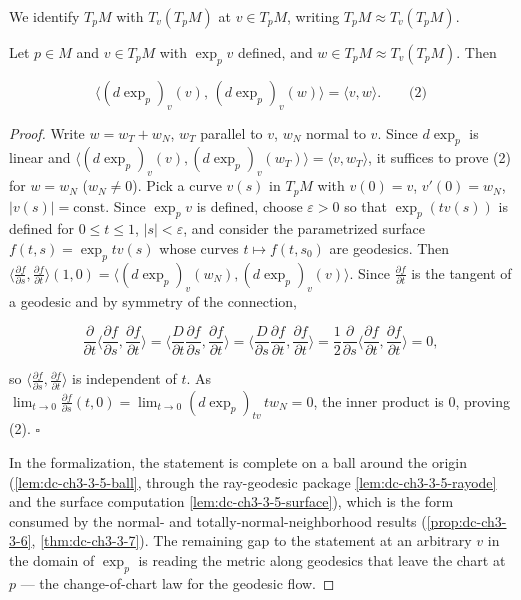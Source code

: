 \begin{lemma}[Gauss]
  \label{lem:dc-ch3-3-5}
  We identify $T_pM$ with $T_v(T_pM)$ at $v\in T_pM$, writing $T_pM\approx T_v(T_pM)$.
  
  Let $p\in M$ and $v\in T_pM$ with $\exp_p v$ defined, and $w\in T_pM\approx T_v(T_pM)$.
  Then
  
  $$
  \langle(d\exp_p)_v(v),\,(d\exp_p)_v(w)\rangle=\langle v,w\rangle.\qquad\text{(2)}
  $$
\end{lemma}
\begin{proof}
  Write $w=w_T+w_N$, $w_T$ parallel to $v$, $w_N$ normal to $v$. Since
  $d\exp_p$ is linear and
  $\langle(d\exp_p)_v(v),(d\exp_p)_v(w_T)\rangle=\langle v,w_T\rangle$, it suffices
  to prove (2) for $w=w_N$ ($w_N\ne 0$). Pick a curve $v(s)$ in $T_pM$ with
  $v(0)=v$, $v'(0)=w_N$, $|v(s)|=\text{const}$. Since $\exp_p v$ is defined,
  choose $\varepsilon>0$ so that $\exp_p(tv(s))$ is defined for $0\le t\le 1$,
  $|s|<\varepsilon$, and consider the parametrized surface
  $f(t,s)=\exp_p tv(s)$ whose curves $t\mapsto f(t,s_0)$ are geodesics.
  Then $\langle\frac{\partial f}{\partial s},\frac{\partial f}{\partial t}\rangle(1,0)=\langle(d\exp_p)_v(w_N),(d\exp_p)_v(v)\rangle$.
  Since $\frac{\partial f}{\partial t}$ is the tangent of a geodesic and by symmetry
  of the connection,
  
  $$
  \frac{\partial}{\partial t}\Big\langle\frac{\partial f}{\partial s},\frac{\partial f}{\partial t}\Big\rangle=\Big\langle\frac{D}{\partial t}\frac{\partial f}{\partial s},\frac{\partial f}{\partial t}\Big\rangle=\Big\langle\frac{D}{\partial s}\frac{\partial f}{\partial t},\frac{\partial f}{\partial t}\Big\rangle=\frac12\frac{\partial}{\partial s}\Big\langle\frac{\partial f}{\partial t},\frac{\partial f}{\partial t}\Big\rangle=0,
  $$
  
  so $\langle\frac{\partial f}{\partial s},\frac{\partial f}{\partial t}\rangle$ is
  independent of $t$. As $\lim_{t\to0}\frac{\partial f}{\partial s}(t,0)=\lim_{t\to0}(d\exp_p)_{tv}\,t w_N=0$,
  the inner product is $0$, proving (2). $\square$

  In the formalization, the statement is complete on a ball around the
  origin (\cref{lem:dc-ch3-3-5-ball}, through the ray-geodesic package
  \cref{lem:dc-ch3-3-5-rayode} and the surface computation
  \cref{lem:dc-ch3-3-5-surface}), which is the form consumed by the normal-
  and totally-normal-neighborhood results
  (\cref{prop:dc-ch3-3-6}, \cref{thm:dc-ch3-3-7}). The remaining gap to the
  statement at an arbitrary $v$ in the domain of $\exp_p$ is reading the
  metric along geodesics that leave the chart at $p$ — the change-of-chart
  law for the geodesic flow.
\end{proof}

